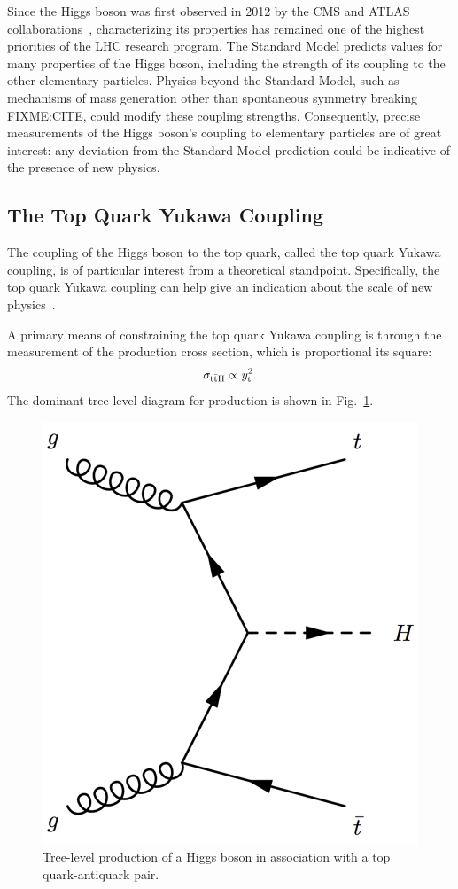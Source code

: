 Since the Higgs boson was first observed in 2012 by the CMS and ATLAS collaborations~\cite{Aad:2012tfa, Chatrchyan:2012xdj, Chatrchyan:2013lba}, characterizing its properties has remained one of the highest priorities of the LHC research program. 
The Standard Model predicts values for many properties of the Higgs boson, including the strength of its coupling to the other elementary particles.
Physics beyond the Standard Model, such as mechanisms of mass generation other than spontaneous symmetry breaking FIXME:CITE, could modify these coupling strengths. 
Consequently, precise measurements of the Higgs boson's coupling to elementary particles are of great interest: any deviation from the Standard Model prediction could be indicative of the presence of new physics.
%
\subsection{The Top Quark Yukawa Coupling}
The coupling of the Higgs boson to the top quark, called the top quark Yukawa coupling, is of particular interest from a theoretical standpoint.
Specifically, the top quark Yukawa coupling can help give an indication about the scale of new physics~\cite{why_care_top_yukawa}.

A primary means of constraining the top quark Yukawa coupling is through the measurement of the \ttH production cross section, which is proportional its square:
\begin{equation}
\sigma_{\mathrm{t\bar{t}H}} \propto y_{\text{t}}^2.
\end{equation}
The dominant tree-level diagram for \ttH production is shown in Fig.~\ref{fig:tth_feynman}.
\begin{figure} [htbp!]
    \centering
    \includegraphics[width=0.4\linewidth]{figures/tth/tth_feynman.png}
    \caption{Tree-level production of a Higgs boson in association with a top quark-antiquark pair.}
    \label{fig:tth_feynman}
\end{figure} 

